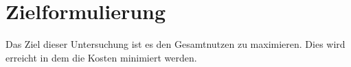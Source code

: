 %
%
%
%

\chapter{Zielformulierung}
\label{chap:background}

Das Ziel dieser Untersuchung ist es den Gesamtnutzen zu maximieren. Dies wird erreicht in dem die Kosten minimiert werden. \\

\blindtext


%

